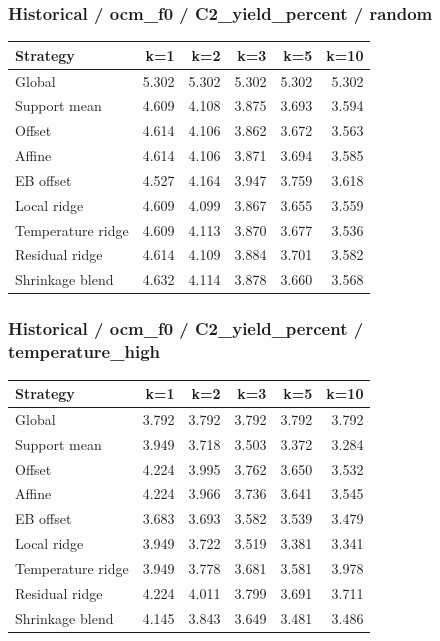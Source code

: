 \subsubsection*{Historical / ocm\_f0 / C2\_yield\_percent / random}
\begin{center}\small
\begin{tabular}{lrrrrr}
\toprule
Strategy & k=1 & k=2 & k=3 & k=5 & k=10 \\
\midrule
Global & 5.302 & 5.302 & 5.302 & 5.302 & 5.302 \\
Support mean & 4.609 & 4.108 & 3.875 & 3.693 & 3.594 \\
Offset & 4.614 & 4.106 & 3.862 & 3.672 & 3.563 \\
Affine & 4.614 & 4.106 & 3.871 & 3.694 & 3.585 \\
EB offset & 4.527 & 4.164 & 3.947 & 3.759 & 3.618 \\
Local ridge & 4.609 & 4.099 & 3.867 & 3.655 & 3.559 \\
Temperature ridge & 4.609 & 4.113 & 3.870 & 3.677 & 3.536 \\
Residual ridge & 4.614 & 4.109 & 3.884 & 3.701 & 3.582 \\
Shrinkage blend & 4.632 & 4.114 & 3.878 & 3.660 & 3.568 \\
\bottomrule
\end{tabular}
\end{center}

\subsubsection*{Historical / ocm\_f0 / C2\_yield\_percent / temperature\_high}
\begin{center}\small
\begin{tabular}{lrrrrr}
\toprule
Strategy & k=1 & k=2 & k=3 & k=5 & k=10 \\
\midrule
Global & 3.792 & 3.792 & 3.792 & 3.792 & 3.792 \\
Support mean & 3.949 & 3.718 & 3.503 & 3.372 & 3.284 \\
Offset & 4.224 & 3.995 & 3.762 & 3.650 & 3.532 \\
Affine & 4.224 & 3.966 & 3.736 & 3.641 & 3.545 \\
EB offset & 3.683 & 3.693 & 3.582 & 3.539 & 3.479 \\
Local ridge & 3.949 & 3.722 & 3.519 & 3.381 & 3.341 \\
Temperature ridge & 3.949 & 3.778 & 3.681 & 3.581 & 3.978 \\
Residual ridge & 4.224 & 4.011 & 3.799 & 3.691 & 3.711 \\
Shrinkage blend & 4.145 & 3.843 & 3.649 & 3.481 & 3.486 \\
\bottomrule
\end{tabular}
\end{center}

